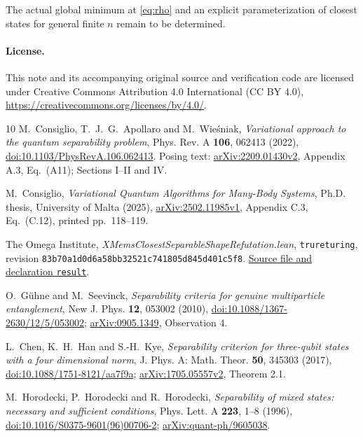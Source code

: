 \documentclass[11pt]{article}
\begin{document}
The actual global minimum at \eqref{eq:rho} and an explicit parameterization
of closest states for general finite $n$ remain to be determined.

\paragraph{License.}
This note and its accompanying original source and verification code are
licensed under Creative Commons Attribution 4.0 International (CC BY 4.0),
\url{https://creativecommons.org/licenses/by/4.0/}.

\begin{thebibliography}{10}
M.~Consiglio, T.~J.~G.~Apollaro and M.~Wie\'sniak,
\emph{Variational approach to the quantum separability problem},
Phys. Rev. A \textbf{106}, 062413 (2022),
\href{https://doi.org/10.1103/PhysRevA.106.062413}{doi:10.1103/PhysRevA.106.062413}.
Posing text: \href{https://arxiv.org/abs/2209.01430v2}{arXiv:2209.01430v2},
Appendix A.3, Eq.~(A11); Sections I--II and IV.

M.~Consiglio, \emph{Variational Quantum Algorithms for Many-Body Systems},
Ph.D. thesis, University of Malta (2025),
\href{https://arxiv.org/abs/2502.11985v1}{arXiv:2502.11985v1},
Appendix C.3, Eq.~(C.12), printed pp.~118--119.

The Omega Institute, \emph{XMemsClosestSeparableShapeRefutation.lean},
\texttt{trureturing}, revision
\texttt{83b70a1d0d6a58bb32521c741805d845d401c5f8}.
\href{https://github.com/the-omega-institute/trureturing/blob/83b70a1d0d6a58bb32521c741805d845d401c5f8/D5/S3/Quantum/Entanglement/GeometricMeasure/XMemsClosestSeparableShapeRefutation.lean}{Source file and declaration \texttt{result}}.

O.~G\"uhne and M.~Seevinck,
\emph{Separability criteria for genuine multiparticle entanglement},
New J. Phys. \textbf{12}, 053002 (2010),
\href{https://doi.org/10.1088/1367-2630/12/5/053002}{doi:10.1088/1367-2630/12/5/053002};
\href{https://arxiv.org/abs/0905.1349}{arXiv:0905.1349}, Observation 4.

L.~Chen, K.~H.~Han and S.-H.~Kye,
\emph{Separability criterion for three-qubit states with a four dimensional norm},
J. Phys. A: Math. Theor. \textbf{50}, 345303 (2017),
\href{https://doi.org/10.1088/1751-8121/aa7f9a}{doi:10.1088/1751-8121/aa7f9a};
\href{https://arxiv.org/abs/1705.05557v2}{arXiv:1705.05557v2}, Theorem 2.1.

M.~Horodecki, P.~Horodecki and R.~Horodecki,
\emph{Separability of mixed states: necessary and sufficient conditions},
Phys. Lett. A \textbf{223}, 1--8 (1996),
\href{https://doi.org/10.1016/S0375-9601(96)00706-2}{doi:10.1016/S0375-9601(96)00706-2};
\href{https://arxiv.org/abs/quant-ph/9605038}{arXiv:quant-ph/9605038}.


\end{thebibliography}
\end{document}
